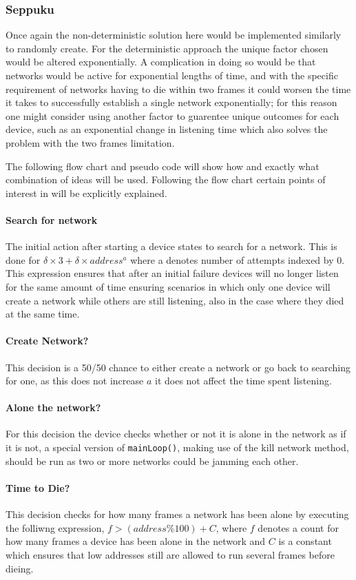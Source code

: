 \subsubsection*{Seppuku}
Once again the non-deterministic solution here would be implemented similarly to randomly create.
For the deterministic approach the unique factor chosen would be altered exponentially.
A complication in doing so would be that networks would be active for exponential lengths of time, and with the specific requirement of networks having to die within two frames it could worsen the time it takes to successfully establish a single network exponentially; for this reason one might consider using another factor to guarentee unique outcomes for each device, such as an exponential change in listening time which also solves the problem with the two frames limitation.

The following flow chart and pseudo code will show how and exactly what combination of ideas will be used.
Following the flow chart certain points of interest in  will be explicitly explained.

\paragraph{Search for network}
The initial action after starting a device states to search for a network.
This is done for $\delta \times 3 + \delta \times address^a$ where a denotes number of attempts indexed by 0. 
This expression ensures that after an initial failure devices will no longer listen for the same amount of time ensuring scenarios in which only one device will create a network while others are still listening, also in the case where they died at the same time.
\paragraph{Create Network?}
This decision is a 50/50 chance to either create a network or go back to searching for one, as this does not increase $a$ it does not affect the time spent listening.
\paragraph{Alone the network?}
For this decision the device checks whether or not it is alone in the network as if it is not, a special version of \texttt{mainLoop()}, making use of the kill network method, should be run as two or more networks could be jamming each other.
\paragraph{Time to Die?}
This decision checks for how many frames a network has been alone by executing the folliwng expression, $f > (address \% 100) + C$, where $f$ denotes a count for how many frames a device has been alone in the network and $C$ is a constant which ensures that low addresses still are allowed to run several frames before dieing.